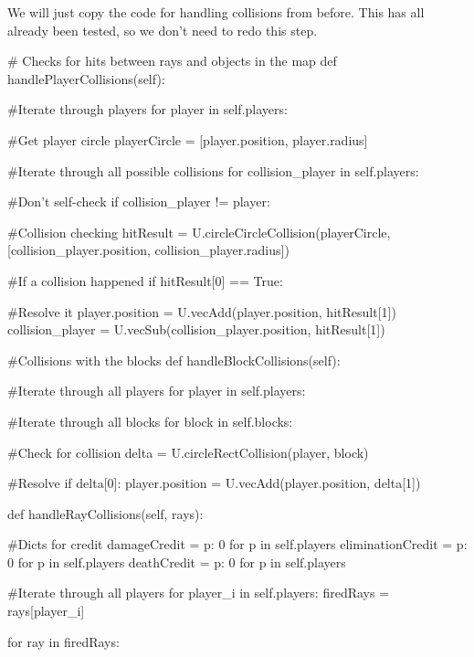 We will just copy the code for handling collisions from before. This has all already been tested, so we don't need to redo this step.

\begin{mpy}
    # Checks for hits between rays and objects in the map
    def handlePlayerCollisions(self):

        #Iterate through players
        for player in self.players:

            #Get player circle
            playerCircle = [player.position, player.radius]

            #Iterate through all possible collisions
            for collision_player in self.players:

                #Don't self-check
                if collision_player != player:

                    #Collision checking
                    hitResult = U.circleCircleCollision(playerCircle, [collision_player.position, collision_player.radius])

                    #If a collision happened
                    if hitResult[0] == True:

                        #Resolve it
                        player.position = U.vecAdd(player.position, hitResult[1])
                        collision_player = U.vecSub(collision_player.position, hitResult[1])

    #Collisions with the blocks
    def handleBlockCollisions(self):

        #Iterate through all players
        for player in self.players:

            #Iterate through all blocks
            for block in self.blocks:

                #Check for collision
                delta = U.circleRectCollision(player, block)

                #Resolve
                if delta[0]:
                    player.position = U.vecAdd(player.position, delta[1])

    def handleRayCollisions(self, rays):
        
        #Dicts for credit
        damageCredit = {p: 0 for p in self.players}
        eliminationCredit = {p: 0 for p in self.players}
        deathCredit = {p: 0 for p in self.players}

        #Iterate through all players
        for player_i in self.players:
            firedRays = rays[player_i]

            for ray in firedRays:


\end{mpy}
